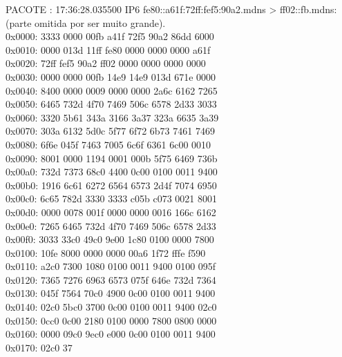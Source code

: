 \documentclass[12pt]{article}
\begin{document}
\newpage
PACOTE : 17:36:28.035500 IP6 fe80::a61f:72ff:fef5:90a2.mdns > ff02::fb.mdns: (parte omitida por ser muito grande).  \\
0x0000:  3333 0000 00fb a41f 72f5 90a2 86dd 6000  \\
0x0010:  0000 013d 11ff fe80 0000 0000 0000 a61f \\
0x0020:  72ff fef5 90a2 ff02 0000 0000 0000 0000  \\
0x0030:  0000 0000 00fb 14e9 14e9 013d 671e 0000  \\
0x0040:  8400 0000 0009 0000 0000 2a6c 6162 7265  \\
0x0050:  6465 732d 4f70 7469 506c 6578 2d33 3033  \\
0x0060:  3320 5b61 343a 3166 3a37 323a 6635 3a39  \\
0x0070:  303a 6132 5d0c 5f77 6f72 6b73 7461 7469   \\
0x0080:  6f6e 045f 7463 7005 6c6f 6361 6c00 0010  \\
0x0090:  8001 0000 1194 0001 000b 5f75 6469 736b  \\
0x00a0:  732d 7373 68c0 4400 0c00 0100 0011 9400  \\
0x00b0:  1916 6c61 6272 6564 6573 2d4f 7074 6950   \\ 
0x00c0:  6c65 782d 3330 3333 c05b c073 0021 8001  \\ 
0x00d0:  0000 0078 001f 0000 0000 0016 166c 6162   \\
0x00e0:  7265 6465 732d 4f70 7469 506c 6578 2d33  \\
0x00f0:  3033 33c0 49c0 9e00 1c80 0100 0000 7800   \\
0x0100:  10fe 8000 0000 0000 00a6 1f72 fffe f590   \\
0x0110:  a2c0 7300 1080 0100 0011 9400 0100 095f   \\
0x0120:  7365 7276 6963 6573 075f 646e 732d 7364  \\
0x0130:  045f 7564 70c0 4900 0c00 0100 0011 9400  \\
0x0140:  02c0 5bc0 3700 0c00 0100 0011 9400 02c0   \\
0x0150:  0cc0 0c00 2180 0100 0000 7800 0800 0000   \\
0x0160:  0000 09c0 9ec0 e000 0c00 0100 0011 9400   \\
0x0170:  02c0 37                                   \\
\end{document}
